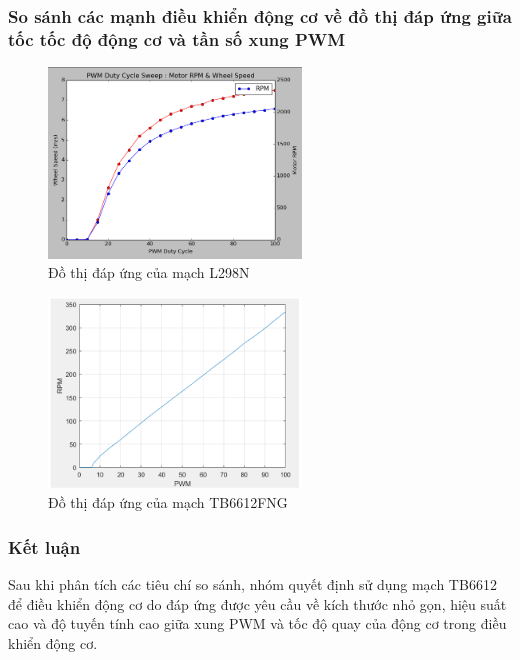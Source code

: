             \subsubsection{So sánh các mạnh điều khiển động cơ về đồ thị đáp ứng giữa tốc tốc độ động cơ và tần số xung PWM}
                \begin{figure}[H]
                    \centering
                    \includegraphics[width=0.6\textwidth]{pictures/chapter2/chapter2_pic_12.png}
                    \caption{Đồ thị đáp ứng của mạch L298N}
                    \label{fig:l298n_response}
                \end{figure}
                \begin{figure}[H]
                    \centering
                    \includegraphics[width=0.6\textwidth]{pictures/chapter2/chapter2_pic_13.png}
                    \caption{Đồ thị đáp ứng của mạch TB6612FNG}
                    \label{fig:tb6612fng_response}
                \end{figure}
            \subsubsection{Kết luận}
                \hspace*{0.6cm}Sau khi phân tích các tiêu chí so sánh, nhóm quyết định sử dụng mạch TB6612 để điều khiển động cơ do đáp ứng được yêu cầu về kích thước nhỏ gọn, hiệu suất cao và độ tuyến tính cao giữa xung PWM và tốc độ quay của động cơ trong điều khiển động cơ.
